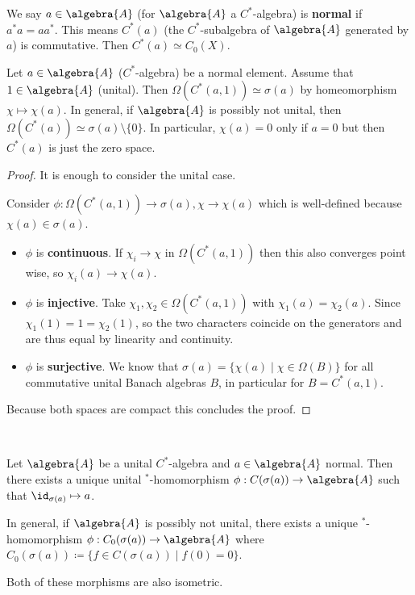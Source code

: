 \documentclass[a4paper]{article}
\begin{document}
\begin{definition}
	We say $a \in \algebra{A}$ (for $\algebra{A}$ a $C^*$-algebra) is \textbf{normal} if $a^* a = a a^*$.
	This means $C^*(a)$ (the $C^*$-subalgebra of $\algebra{A}$ generated by $a$) is commutative.
	Then $C^*(a) \simeq C_0(X)$.
\end{definition}

\begin{lemma}
	Let $a \in \algebra{A}$ ($C^*$-algebra) be a normal element.
	Assume that $1 \in \algebra{A}$ (unital).
	Then $\Omega(C^*(a,1)) \simeq \sigma(a)$ by homeomorphism $\chi \mapsto \chi(a)$.
	In general, if $\algebra{A}$ is possibly not unital, then $\Omega(C^*(a)) \simeq \sigma(a) \setminus \{0\}$.
	In particular, $\chi(a) = 0$ only if $a = 0$ but then $C^*(a)$ is just the zero space.
\end{lemma}

\begin{proof}
	It is enough to consider the unital case.

	Consider $\phi: \Omega(C^*(a,1)) \to \sigma(a), \chi \to \chi(a)$ which is well-defined because $\chi(a) \in \sigma(a)$.
	\begin{itemize}
		\item $\phi$ is \textbf{continuous}.
		If $\chi_i \to \chi$ in $\Omega(C^*(a,1))$ then this also converges point wise, so $\chi_i(a) \to \chi(a)$.
		\item $\phi$ is \textbf{injective}.
		Take $\chi_1, \chi_2 \in \Omega(C^*(a,1))$ with $\chi_1(a) = \chi_2(a)$.
		Since $\chi_1(1) = 1 = \chi_2(1)$, so the two characters coincide on the generators and are thus equal by linearity and continuity.
		\item $\phi$ is \textbf{surjective}. We know that $\sigma(a) = \{ \chi(a) \mid \chi \in \Omega(B)\}$ for all commutative unital Banach algebras $B$, in particular for $B = C^*(a,1)$.
	\end{itemize}
	Because both spaces are compact this concludes the proof.
\end{proof}

\begin{theorem}
	~

	Let $\algebra{A}$ be a unital $C^*$-algebra and $a \in \algebra{A}$ normal.
	Then there exists a unique unital $^*$-homomorphism $\phi: C(\sigma(a)) \to \algebra{A}$ such that $\id_{\sigma(a)} \mapsto a$.

	In general, if $\algebra{A}$ is possibly not unital, there exists a unique $^*$-homomorphism $\phi: C_0(\sigma(a)) \to \algebra{A}$ where $C_0(\sigma(a)) \coloneq \{ f \in C(\sigma(a)) \mid f(0) = 0\}$.

	Both of these morphisms are also isometric.
\end{theorem}
\end{document}
